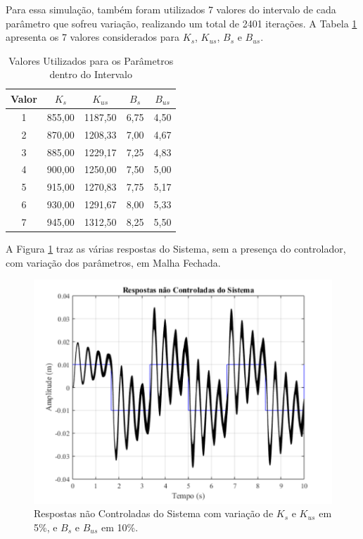 \documentclass[journal,brazil,english]{IEEEtran}
\begin{document}
Para essa simulação, também foram utilizados 7 valores do intervalo de cada parâmetro que sofreu variação, realizando um total de 2401 iterações. A Tabela \ref{caso2} apresenta os 7 valores considerados para $K_s$, $K_{us}$, $B_s$ e $B_{us}$.

\begin{table}[H]{\centering}
\centering
    \caption{Valores Utilizados para os Parâmetros dentro do Intervalo}
    \begin{tabular}{|c|c|c|c|c|} \hline
        Valor & $K_s$ & $K_{us}$ & $B_s$ & $B_{us}$ \\ \hline
        1 & 855,00 & 1187,50 & 6,75 & 4,50 \\ \hline
        2 & 870,00 & 1208,33 & 7,00 & 4,67 \\ \hline
        3 & 885,00 & 1229,17 & 7,25 & 4,83 \\ \hline
        4 & 900,00 & 1250,00 & 7,50 & 5,00 \\ \hline
        5 & 915,00 & 1270,83 & 7,75 & 5,17 \\ \hline
        6 & 930,00 & 1291,67 & 8,00 & 5,33 \\ \hline
        7 & 945,00 & 1312,50 & 8,25 & 5,50 \\ \hline
    \end{tabular}
    \label{caso2}
\end{table}

A Figura \ref{sistemaIntervalar2} traz as várias respostas do Sistema, sem a presença do controlador, com variação dos parâmetros, em Malha Fechada.
\begin{figure}[H]
	\centering
\includegraphics[width=\columnwidth]{./imagens/resposta_sistema_variando_Ks_Kus_5_Bs_Bus_10.pdf}
    \renewcommand{\figurename}{Fig.}
    \caption{Respostas não Controladas do Sistema com variação de $K_s$ e $K_{us}$ em 5\%, e $B_s$ e $B_{us}$ em 10\%.}
	\label{sistemaIntervalar2}
\end{figure}
\end{document}
